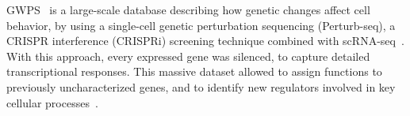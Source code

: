 \gls{GWPS}~\cite{RN89} is a large-scale database describing how genetic changes affect cell behavior, by using a single-cell genetic perturbation sequencing (Perturb-seq), a \gls{CRISPR} interference (CRISPRi) screening technique combined with \gls{scRNA-seq}~\cite{RN89}. With this approach, every expressed gene was silenced, to capture detailed transcriptional responses. This massive dataset allowed to assign functions to previously uncharacterized genes, and to identify new regulators involved in key cellular processes~\cite{RN89}.

